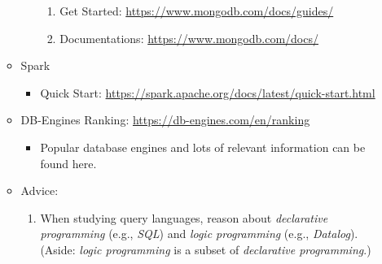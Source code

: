 \documentclass{article}
\begin{document}
\begin{enumerate}
\begin{itemize}
\begin{itemize}
            \begin{enumerate}
                \item Get Started:
                \href{https://www.mongodb.com/docs/guides/}{https://www.mongodb.com/docs/guides/}
                \item Documentations:
                \href{https://www.mongodb.com/docs/}{https://www.mongodb.com/docs/}
            \end{enumerate}
        \end{itemize}
        \item Spark
        \begin{itemize}
            \item Quick Start:
            \href{https://spark.apache.org/docs/latest/quick-start.html}{https://spark.apache.org/docs/latest/quick-start.html}
        \end{itemize}
        \item DB-Engines Ranking:
            \href{https://db-engines.com/en/ranking}{https://db-engines.com/en/ranking}
            \begin{itemize}
                \item Popular database engines and lots of relevant information can be found here.
            \end{itemize}        
        \item Advice:
        \begin{enumerate}
            \item When studying query languages, reason about \emph{declarative programming} (e.g., \emph{SQL}) and \emph{logic programming} (e.g., \emph{Datalog}).
            (Aside: \emph{logic programming} is a subset of \emph{declarative programming}.)
        \end{enumerate}
    \end{itemize}


\end{enumerate}
\end{document}
